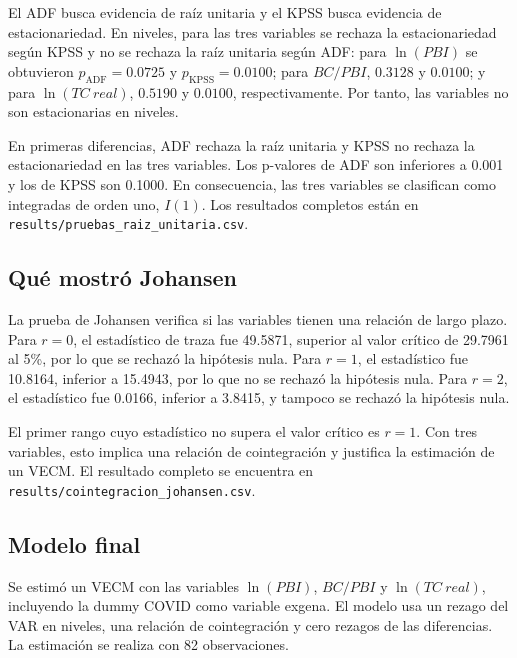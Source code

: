 \documentclass[12pt,a4paper]{article}
\begin{document}
El ADF busca evidencia de raíz unitaria y el KPSS busca evidencia de
estacionariedad. En niveles, para las tres variables se rechaza la
estacionariedad según KPSS y no se rechaza la raíz unitaria según ADF:
para $\ln(PBI)$ se obtuvieron $p_{\mathrm{ADF}}=0.0725$ y
$p_{\mathrm{KPSS}}=0.0100$; para $BC/PBI$, $0.3128$ y $0.0100$; y para
$\ln(TC\ real)$, $0.5190$ y $0.0100$, respectivamente. Por tanto, las
variables no son estacionarias en niveles.

En primeras diferencias, ADF rechaza la raíz unitaria y KPSS no rechaza la
estacionariedad en las tres variables. Los p-valores de ADF son inferiores a
0.001 y los de KPSS son 0.1000. En consecuencia, las tres variables se
clasifican como integradas de orden uno, $I(1)$. Los resultados completos
están en
\texttt{results/pruebas\_raiz\_unitaria.csv}.

\subsection{Qué mostró Johansen}

La prueba de Johansen verifica si las variables tienen una relación de largo
plazo. Para $r=0$, el estadístico de traza fue 49.5871, superior al valor
crítico de 29.7961 al 5\%, por lo que se rechazó la hipótesis nula. Para
$r=1$, el estadístico fue 10.8164, inferior a 15.4943, por lo que no se
rechazó la hipótesis nula. Para $r=2$, el estadístico fue 0.0166, inferior a
3.8415, y tampoco se rechazó la hipótesis nula.

El primer rango cuyo estadístico no supera el valor crítico es $r=1$.
Con tres variables, esto implica una relación de cointegración y justifica
la estimación de un VECM. El resultado completo se encuentra en
\texttt{results/cointegracion\_johansen.csv}.

\subsection{Modelo final}

Se estimó un VECM con las variables $\ln(PBI)$, $BC/PBI$ y
$\ln(TC\ real)$, incluyendo la dummy COVID como variable exgena. El modelo
usa un rezago del VAR en niveles, una relación de cointegración y cero
rezagos de las diferencias. La estimación se realiza con 82 observaciones.
\end{document}
